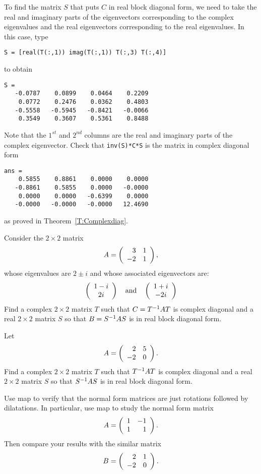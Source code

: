 \documentclass{ximera}
\begin{document}
To find the matrix $S$ that puts $C$ in real block diagonal form, we
need to take the real and imaginary parts of the eigenvectors 
corresponding to the complex eigenvalues and the real eigenvectors 
corresponding to the real eigenvalues.  In this case, type
\begin{verbatim}
S = [real(T(:,1)) imag(T(:,1)) T(:,3) T(:,4)]
\end{verbatim}
to obtain 
\begin{verbatim}
S =
   -0.0787    0.0899    0.0464    0.2209
    0.0772    0.2476    0.0362    0.4803
   -0.5558   -0.5945   -0.8421   -0.0066
    0.3549    0.3607    0.5361    0.8488
\end{verbatim} 
Note that the $1^{st}$ and $2^{nd}$ columns are the real and 
imaginary parts of the complex eigenvector.  Check that 
{\tt inv(S)*C*S} is the matrix in complex diagonal form
\begin{verbatim}
ans = 
    0.5855    0.8861    0.0000    0.0000
   -0.8861    0.5855    0.0000   -0.0000
    0.0000    0.0000   -0.6399    0.0000
   -0.0000   -0.0000   -0.0000   12.4690
\end{verbatim}
as proved in Theorem~\ref{T:Complexdiag}.



\EXER

\TEXER


\begin{exercise}  \label{c10.4.3}
Consider the $2\times 2$ matrix 
\[
A = \left(\begin{array}{rr} 3 & 1\\ -2 &1\end{array}\right),
\]
whose eigenvalues are $2\pm i$ and whose associated eigenvectors are:
\[
\left(\begin{array}{c} 1-i \\ 2i\end{array}\right) \quad\mbox{and}\quad \left(\begin{array}{c} 1+i \\ -2i\end{array}\right)
\]
Find a complex $2\times 2$ matrix $T$ such that $C=T^{-1} AT$ is complex
diagonal and a real $2\times 2$ matrix $S$ so that $B=S^{-1} AS$ is in real
block diagonal form.
\end{exercise}

\begin{exercise}  \label{c10.4.4}
Let 
\[
A=\left(\begin{array}{rr} 2 & 5\\ -2 &0\end{array}\right).
\]
Find a complex $2\times 2$ matrix $T$ such that $T^{-1} AT$ is complex
diagonal and a real $2\times 2$ matrix $S$ so that $S^{-1} AS$ is in real
block diagonal form.
\end{exercise}



\CEXER

\begin{exercise} \label{c10.4.rotate}
Use {\sf map} to verify that 
the normal form matrices  are 
just rotations followed by dilatations.  In particular, use {\sf map} to 
study the normal form matrix
\[
A = \left(\begin{array}{rr} 1 & -1\\ 1 &1\end{array}\right).
\]
Then compare your results with the similar matrix
\[
B = \left(\begin{array}{rr} 2 & 1\\ -2 &0\end{array}\right).
\]
\end{exercise}
\end{document}
